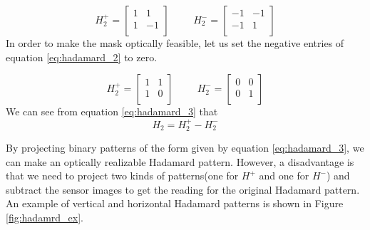 \begin{equation}
H_2^+ = \begin{bmatrix} 
       1 & 1 \\
       1 & -1 \\
    \end{bmatrix}
   \hspace{1cm}
   H_2^- = \begin{bmatrix} 
       -1 & -1 \\
       -1 & 1 \\
    \end{bmatrix}
    \label{eq:hadamard_2}
\end{equation}
In order to make the mask optically feasible, let us set the negative entries of equation \ref{eq:hadamard_2} to zero.

\begin{equation}
H_2^+ = \begin{bmatrix} 
       1 & 1 \\
       1 & 0 \\
    \end{bmatrix}
   \hspace{1cm}
   H_2^- = \begin{bmatrix} 
       0 & 0 \\
       0 & 1 \\
    \end{bmatrix}
    \label{eq:hadamard_3}
\end{equation}
We can see from equation \ref{eq:hadamard_3} that 
\begin{equation}
H_2 = H_2^+ - H_2^-
\label{eq:hadamard_4}
\end{equation}

By projecting binary patterns of the form given by equation \ref{eq:hadamard_3}, we can make an optically realizable Hadamard pattern. However, a disadvantage is that we need to project two kinds of patterns(one for $H^+$ and one for $H^-$) and subtract the sensor images to get the reading for the original Hadamard pattern. An example of vertical and horizontal Hadamard patterns is shown in Figure \ref{fig:hadamrd_ex}. 

